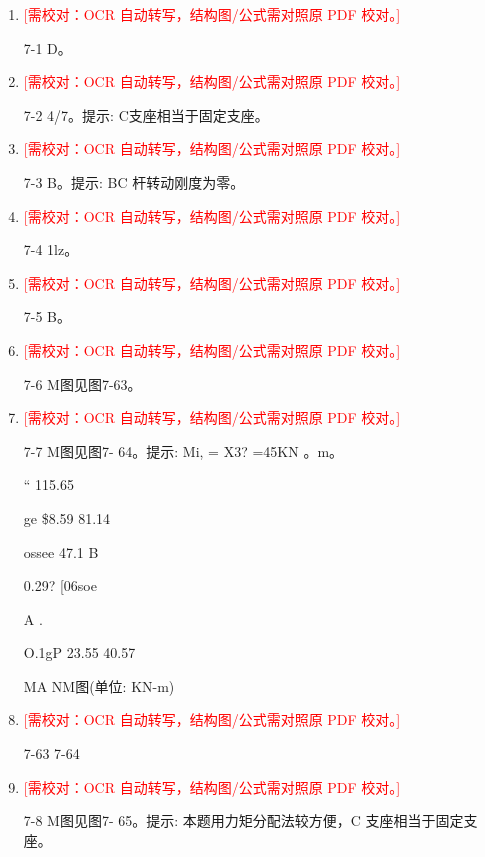 \documentclass[UTF8,12pt,a4paper,openany]{ctexbook}
\newcommand{\TODO}[1]{\textcolor{red}{[需校对：#1]}}
\begin{document}
\begin{enumerate}[label=\textbf{\arabic*.},leftmargin=2em]
\item \TODO{OCR 自动转写，结构图/公式需对照原 PDF 校对。}\par 7-1 D。
\item \TODO{OCR 自动转写，结构图/公式需对照原 PDF 校对。}\par 7-2 4/7。提示: C支座相当于固定支座。
\item \TODO{OCR 自动转写，结构图/公式需对照原 PDF 校对。}\par 7-3 B。提示: BC 杆转动刚度为零。
\item \TODO{OCR 自动转写，结构图/公式需对照原 PDF 校对。}\par 7-4 1lz。
\item \TODO{OCR 自动转写，结构图/公式需对照原 PDF 校对。}\par 7-5 B。
\item \TODO{OCR 自动转写，结构图/公式需对照原 PDF 校对。}\par 7-6 M图见图7-63。
\item \TODO{OCR 自动转写，结构图/公式需对照原 PDF 校对。}\par 7-7 M图见图7- 64。提示: Mi, = X3? =45KN 。m。\par “     115.65\par ge                  \$8.59                81.14\par ossee                            47.1    B\par 0.29? [06soe\par A    .\par O.1gP                          23.55         40.57\par MA                            NM图(单位: KN-m)
\item \TODO{OCR 自动转写，结构图/公式需对照原 PDF 校对。}\par 7-63 7-64
\item \TODO{OCR 自动转写，结构图/公式需对照原 PDF 校对。}\par 7-8 M图见图7- 65。提示: 本题用力矩分配法较方便，C 支座相当于固定支座。

\end{enumerate}
\end{document}
